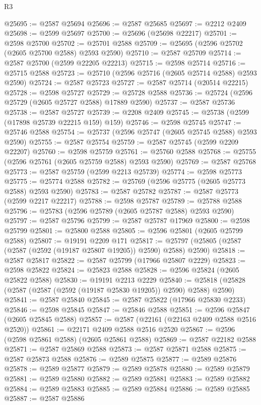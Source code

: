 \begin{lexlean}{R3}
\begin{coremodule}
@25695 := @2587 @25694
@25696 := @2587 @25685
@25697 := @2212 @2409
@25698 := @2599 @25697
@25700 := @25696 (@25698 @22217)
@25701 := @2598 @25700
@25702 := @25701 @2588
@25709 := @25695 (@2596 @25702 (@2605 @25700 @2588) @2593 @2590)
@25710 := @2587 @25709
@25714 := @2587 @25700 (@2599 @22205 @22213)
@25715 := @2598 @25714
@25716 := @25715 @2588
@25723 := @25710 (@2596 @25716 (@2605 @25714 @2588) @2593 @2590)
@25724 := @2587 @25723
@25727 := @2587 @25714 (@20514 @22215)
@25728 := @2598 @25727
@25729 := @25728 @2588
@25736 := @25724 (@2596 @25729 (@2605 @25727 @2588) @17889 @2590)
@25737 := @2587 @25736
@25738 := @2587 @25727
@25739 := @2208 @2409
@25745 := @25738 (@2599 (@17898 @25739 @22215 @159) @159)
@25746 := @2598 @25745
@25747 := @25746 @2588
@25754 := @25737 (@2596 @25747 (@2605 @25745 @2588) @2593 @2590)
@25755 := @2587 @25754
@25759 := @2587 @25745 (@2599 @2209 @22207)
@25760 := @2598 @25759
@25761 := @25760 @2588
@25768 := @25755 (@2596 @25761 (@2605 @25759 @2588) @2593 @2590)
@25769 := @2587 @25768
@25773 := @2587 @25759 (@2599 @2213 @25739)
@25774 := @2598 @25773
@25775 := @25774 @2588
@25782 := @25769 (@2596 @25775 (@2605 @25773 @2588) @2593 @2590)
@25783 := @2587 @25782
@25787 := @2587 @25773 (@2599 @2217 @22217)
@25788 := @2598 @25787
@25789 := @25788 @2588
@25796 := @25783 (@2596 @25789 (@2605 @25787 @2588) @2593 @2590)
@25797 := @2587 @25796
@25799 := @2587 @25787 @17969
@25800 := @2598 @25799
@25801 := @25800 @2588
@25805 := @2596 @25801 (@2605 @25799 @2588)
@25807 := @19191 @2209 @171
@25817 := @25797 (@25805 (@2587 (@2587 (@2592 (@19187 @25807 @19205)) @2590) @2588) @2590)
@25818 := @2587 @25817
@25822 := @2587 @25799 (@17966 @25807 @2229)
@25823 := @2598 @25822
@25824 := @25823 @2588
@25828 := @2596 @25824 (@2605 @25822 @2588)
@25830 := @19191 @2213 @2229
@25840 := @25818 (@25828 (@2587 (@2587 (@2592 (@19187 @25830 @19205)) @2590) @2588) @2590)
@25841 := @2587 @25840
@25845 := @2587 @25822 (@17966 @25830 @2233)
@25846 := @2598 @25845
@25847 := @25846 @2588
@25851 := @2596 @25847 (@2605 @25845 @2588)
@25857 := @2587 (@22161 (@22163 @2409 @2588 @2516 @2520))
@25861 := @22171 @2409 @2588 @2516 @2520
@25867 := @2596 (@2598 @25861 @2588) (@2605 @25861 @2588)
@25869 := @2587 @22182 @2588
@25871 := @2587 @25869 @2588
@25873 := @2587 @25871 @2588
@25875 := @2587 @25873 @2588
@25876 := @2589 @25875
@25877 := @2589 @25876
@25878 := @2589 @25877
@25879 := @2589 @25878
@25880 := @2589 @25879
@25881 := @2589 @25880
@25882 := @2589 @25881
@25883 := @2589 @25882
@25884 := @2589 @25883
@25885 := @2589 @25884
@25886 := @2589 @25885
@25887 := @2587 @25886

\end{coremodule}
\end{lexlean}
